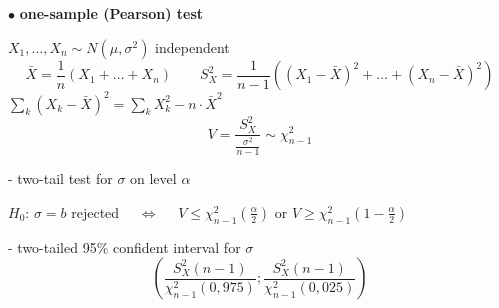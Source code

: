 \documentclass[twoside]{book}
\begin{document}
\pagestyle{empty}

\def\dr #1{\par\noindent $\bullet$ {\bf #1}}



\dr{one-sample (Pearson) test}
\vspace*{2mm}
\par $X_{1},\dots,X_{n}\sim N(\mu,\sigma^2)$ independent
$$\bar{X}=\frac1{n}\left(X_1 + \dots + X_{n}\right) \qquad S_{X}^2=\frac1{n-1}\left((X_1-\bar{X})^2 + \dots + (X_{n}-\bar{X})^2\right)$$
$\sum_{k}(X_{k}-\bar{X})^2=   \sum_{k}X_{k}^2- n\cdot \bar{X}^2    $
$$ \qquad  V=\frac{S_{X}^2}{\frac{\sigma^2}{n-1}}\sim \chi^2_{n-1}  \qquad  $$
\par\noindent - two-tail test for $\sigma$ on level $\alpha$
\vspace*{3mm}
\par $H_0$:  $\sigma=b$ rejected $\quad\Longleftrightarrow\quad$
      $V\leq \chi_{n-1}^2 (\frac{\alpha}2)$ or  $V\geq \chi_{n-1}^2 (1-\frac{\alpha}2)$
\vspace*{5mm}
\par\noindent - two-tailed 95\% confident interval for $\sigma$
    $$\left(\frac{S^2_{X} (n-1)}{\chi^2_{n-1}(0,975)}; \frac{S^2_{X} (n-1)}{\chi^2_{n-1}(0,025)}  \right)$$
\end{document}
